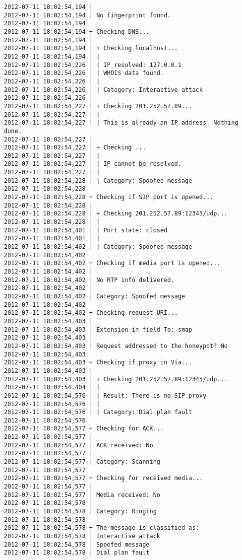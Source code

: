 \documentclass[a4paper,12pt]{report}
\newenvironment{mytinylisting}
{\begin{list}{}{\setlength{\leftmargin}{1em}}\item\tiny\bfseries}
{\end{list}}
\begin{document}
\begin{mytinylisting}
\begin{verbatim}
2012-07-11 18:02:54,194 |
2012-07-11 18:02:54,194 | No fingerprint found.
2012-07-11 18:02:54,194 
2012-07-11 18:02:54,194 + Checking DNS...
2012-07-11 18:02:54,194 |
2012-07-11 18:02:54,194 | + Checking localhost...
2012-07-11 18:02:54,194 | |
2012-07-11 18:02:54,226 | | IP resolved: 127.0.0.1
2012-07-11 18:02:54,226 | | WHOIS data found.
2012-07-11 18:02:54,226 | |
2012-07-11 18:02:54,226 | | Category: Interactive attack
2012-07-11 18:02:54,226 |
2012-07-11 18:02:54,227 | + Checking 201.252.57.89...
2012-07-11 18:02:54,227 | |
2012-07-11 18:02:54,227 | | This is already an IP address. Nothing done.
2012-07-11 18:02:54,227 |
2012-07-11 18:02:54,227 | + Checking ...
2012-07-11 18:02:54,227 | |
2012-07-11 18:02:54,227 | | IP cannot be resolved.
2012-07-11 18:02:54,227 | |
2012-07-11 18:02:54,228 | | Category: Spoofed message
2012-07-11 18:02:54,228 
2012-07-11 18:02:54,228 + Checking if SIP port is opened...
2012-07-11 18:02:54,228 |
2012-07-11 18:02:54,228 | + Checking 201.252.57.89:12345/udp...
2012-07-11 18:02:54,228 | |
2012-07-11 18:02:54,401 | | Port state: closed
2012-07-11 18:02:54,401 | |
2012-07-11 18:02:54,402 | | Category: Spoofed message
2012-07-11 18:02:54,402 
2012-07-11 18:02:54,402 + Checking if media port is opened...
2012-07-11 18:02:54,402 |
2012-07-11 18:02:54,402 | No RTP info delivered.
2012-07-11 18:02:54,402 |
2012-07-11 18:02:54,402 | Category: Spoofed message
2012-07-11 18:02:54,402 
2012-07-11 18:02:54,402 + Checking request URI...
2012-07-11 18:02:54,403 |
2012-07-11 18:02:54,403 | Extension in field To: smap
2012-07-11 18:02:54,403 |
2012-07-11 18:02:54,403 | Request addressed to the honeypot? No
2012-07-11 18:02:54,403 
2012-07-11 18:02:54,403 + Checking if proxy in Via...
2012-07-11 18:02:54,403 |
2012-07-11 18:02:54,403 | + Checking 201.252.57.89:12345/udp...
2012-07-11 18:02:54,404 | |
2012-07-11 18:02:54,576 | | Result: There is no SIP proxy
2012-07-11 18:02:54,576 | |
2012-07-11 18:02:54,576 | | Category: Dial plan fault
2012-07-11 18:02:54,576 
2012-07-11 18:02:54,577 + Checking for ACK...
2012-07-11 18:02:54,577 |
2012-07-11 18:02:54,577 | ACK received: No
2012-07-11 18:02:54,577 |
2012-07-11 18:02:54,577 | Category: Scanning
2012-07-11 18:02:54,577 
2012-07-11 18:02:54,577 + Checking for received media...
2012-07-11 18:02:54,577 |
2012-07-11 18:02:54,577 | Media received: No
2012-07-11 18:02:54,578 |
2012-07-11 18:02:54,578 | Category: Ringing
2012-07-11 18:02:54,578 
2012-07-11 18:02:54,578 + The message is classified as:
2012-07-11 18:02:54,578 | Interactive attack
2012-07-11 18:02:54,578 | Spoofed message
2012-07-11 18:02:54,578 | Dial plan fault

\end{verbatim}
\end{mytinylisting}
\end{document}

